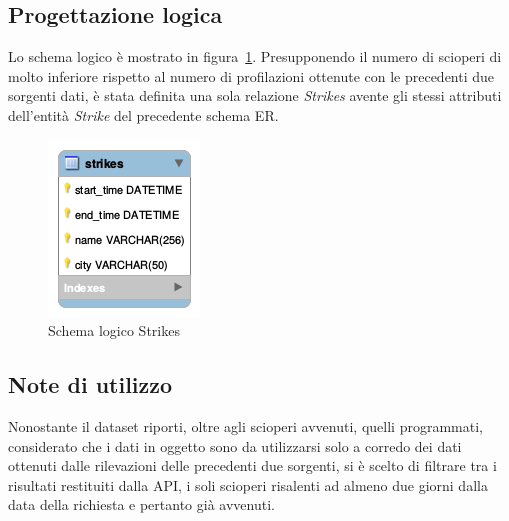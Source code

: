 \subsection{Progettazione logica}

Lo schema logico è mostrato in figura~\ref{fig:strikes_logic}.
Presupponendo il numero di scioperi di molto inferiore rispetto al numero di profilazioni
ottenute con le precedenti due sorgenti dati, è stata definita una sola relazione
\textit{Strikes} avente gli stessi attributi dell'entità \textit{Strike} del precedente 
schema ER.

\begin{figure}                                                                                                                                                            
\centering                                                                                                                                                                   
\includegraphics{diagrams/strikes_logic}                                                                                                                                   
\caption{Schema logico Strikes}                                                                                                                                            
\label{fig:strikes_logic}                                                                                                                                                           
\end{figure}

\subsection{Note di utilizzo}

Nonostante il dataset riporti, oltre agli scioperi avvenuti, quelli programmati,
considerato che i dati in oggetto sono da utilizzarsi solo a corredo dei dati
ottenuti dalle rilevazioni delle precedenti due sorgenti, si è scelto di filtrare
tra i risultati restituiti dalla API, i soli scioperi risalenti ad almeno due
giorni dalla data della richiesta e pertanto già avvenuti.

